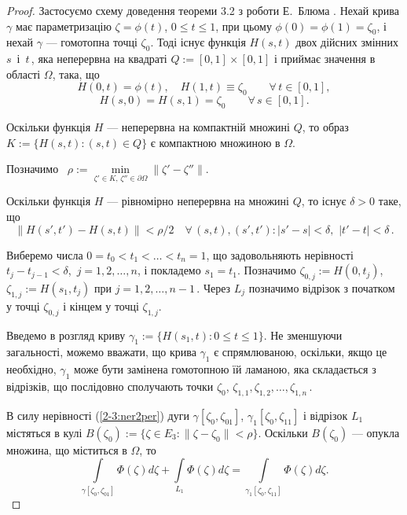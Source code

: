 \documentclass[11pt, reqno]{amsart}
\begin{document}
\begin{proof}
Застосуємо схему доведення теореми 3.2 з роботи Е.~Блю\-ма \cite{Blum}.
Нехай крива $\gamma$ має параметризацію $\zeta=\phi(t)$, $0\leq
t\leq1$, при цьому $\phi(0)=\phi(1)=\zeta_0$, і нехай $\gamma$ --- гомотопна точці $\zeta_0$.
Тоді існує функція $H(s,t)$ двох дійсних змінних\, $s$\, і\, $t$\,, яка  неперервна на квадраті
$Q:=[0,1]\times[0,1]$ і приймає значення в області $\Omega$, така, що
\[H(0,t)=\phi(t),\quad H(1,t)\equiv\zeta_0\qquad\forall\,t\in[0,1],\]
\[H(s,0)=H(s,1)=\zeta_0\qquad\forall\,s\in[0,1].\]

Оскільки функція $H$ --- неперервна на компактній множині $Q$, то образ $K:=\{H(s,t) : (s,t)\in Q\}$
є компактною множиною в $\Omega$.

Позначимо\,\,\, $\rho:=\min\limits_{\zeta'\in K,\,\zeta''\in\partial\Omega}\|\zeta'-\zeta''\|$.

Оскільки функція $H$ --- рівномірно неперервна на множині $Q$, то існує
$\delta>0$ таке, що
\begin{equation}\label{2-3:ner2per}
\|H(s',t')-H(s,t)\|<\rho/2\quad \forall\,(s,t), (s',t') :
|s'-s|<\delta,\,\,|t'-t|<\delta\,.
\end{equation}

Виберемо числа $0=t_0<t_1<\ldots<t_n=1$, що задовольняють нерівності $t_j-t_{j-1}<\delta$,\, $j=1,2,\ldots,n$,
і покладемо
$s_1=t_1$. Позначимо $\zeta_{0,j}:=H(0,t_j)$, $\zeta_{1,j}:=H(s_1,t_j)$ при $j=1,2,\ldots,n-1$\,.
Через $L_j$ позначимо відрізок з початком у точці $\zeta_{0,j}$ і кінцем у точці $\zeta_{1,j}$.

Введемо в розгляд криву $\gamma_1:=\{H(s_1,t) : 0\leq t\leq1\}$.
Не зменшуючи загальності, можемо вважати, що крива $\gamma_1$ є спрямлюваною, оскільки, якщо це необхідно,
$\gamma_1$ може бути замінена гомотопною їй ламаною, яка складається з відрізків, що послідовно сполучають точки
$\zeta_0$, $\zeta_{1,1}, \zeta_{1,2},\dots, \zeta_{1,n}$\,.

В силу нерівності (\ref{2-3:ner2per}) дуги $\gamma[\zeta_0,\zeta_{01}]$,
$\gamma_1[\zeta_0,\zeta_{11}]$ і відрізок $L_1$ містяться в кулі
$B(\zeta_0):=\{\zeta\in E_3 : \|\zeta-\zeta_0\|<\rho\}$. Оскільки $B(\zeta_0)$ --- опукла множина, що міститься в
$\Omega$, то
\begin{equation}\label{2-3:rivn-0K}
\int\limits_{\gamma[\zeta_0,\zeta_{01}]}\Phi(\zeta)d\zeta+
\int\limits_{L_1}\Phi(\zeta)d\zeta=\int\limits_{\gamma_1[\zeta_0,\zeta_{11}]}\Phi(\zeta)d\zeta.
\end{equation}


\end{proof}
\end{document}

